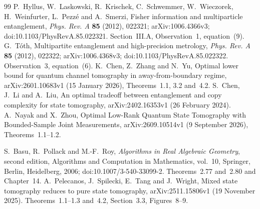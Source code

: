 \begin{thebibliography}{99}
 P.~Hyllus, W.~Laskowski, R.~Krischek,
C.~Schwemmer, W.~Wieczorek, H.~Weinfurter, L.~Pezz\'e and A.~Smerzi,
Fisher information and multiparticle entanglement,
\emph{Phys. Rev. A} \textbf{85} (2012), 022321;
arXiv:1006.4366v3; doi:10.1103/PhysRevA.85.022321.
Section~III.A, Observation~1, equation~(9).
 G.~T\'oth,
Multipartite entanglement and high-precision metrology,
\emph{Phys. Rev. A} \textbf{85} (2012), 022322;
arXiv:1006.4368v3; doi:10.1103/PhysRevA.85.022322.
Observation~3, equation~(6).
 K.~Chen, Z.~Zhang and N.~Yu,
Optimal lower bound for quantum channel tomography in away-from-boundary regime,
arXiv:2601.10683v1 (15 January 2026), Theorems~1.1, 3.2 and~4.2.
 S.~Chen, J.~Li and A.~Liu,
An optimal tradeoff between entanglement and copy complexity for state tomography,
arXiv:2402.16353v1 (26 February 2024).
 A.~Nayak and X.~Zhou,
Optimal Low-Rank Quantum State Tomography with Bounded-Sample Joint Measurements,
arXiv:2609.10514v1 (9 September 2026), Theorems~1.1--1.2.

 S.~Basu, R.~Pollack and M.-F.~Roy,
\emph{Algorithms in Real Algebraic Geometry}, second edition,
Algorithms and Computation in Mathematics, vol.~10,
Springer, Berlin, Heidelberg, 2006;
doi:10.1007/3-540-33099-2.
Theorems~2.77 and~2.80 and Chapter~14.
 A.~Pelecanos, J.~Spilecki, E.~Tang and J.~Wright,
Mixed state tomography reduces to pure state tomography,
arXiv:2511.15806v1 (19 November 2025).
Theorems~1.1--1.3 and~4.2, Section~3.3, Figures~8--9.


\end{thebibliography}
